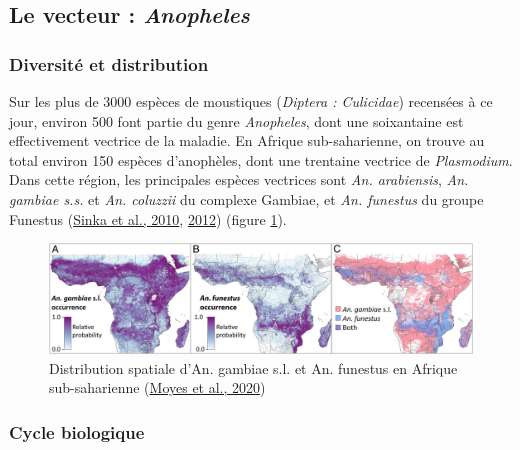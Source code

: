 \documentclass[12pt,twoside]{reedthesis}
\begin{document}
\hypertarget{le-vecteur-anopheles}{%
\subsection{\texorpdfstring{Le vecteur : \emph{Anopheles}}{Le vecteur : Anopheles}}\label{le-vecteur-anopheles}}

\hypertarget{diversituxe9-et-distribution-1}{%
\subsubsection{Diversité et distribution}\label{diversituxe9-et-distribution-1}}

Sur les plus de 3000 espèces de moustiques (\emph{Diptera : Culicidae}) recensées à ce jour, environ 500 font partie du genre \emph{Anopheles}, dont une soixantaine est effectivement vectrice de la maladie. En Afrique sub-saharienne, on trouve au total environ 150 espèces d'anophèles, dont une trentaine vectrice de \emph{Plasmodium}. Dans cette région, les principales espèces vectrices sont \emph{An. arabiensis}, \emph{An. gambiae s.s.} et \emph{An. coluzzii} du complexe Gambiae, et \emph{An. funestus} du groupe Funestus (\protect\hyperlink{ref-sinka_dominant_2010}{Sinka et al., 2010}, \protect\hyperlink{ref-sinka_global_2012}{2012}) (figure \ref{fig:distrib-vectors}).\\
\begin{figure}

{\centering \includegraphics[width=1\linewidth]{figure/distrib_vectors} 

}

\caption[Distribution spatiale d'An. gambiae s.l. et An. funestus en Afrique sub-saharienne]{Distribution spatiale d'An. gambiae s.l. et An. funestus en Afrique sub-saharienne (\protect\hyperlink{ref-moyes_evaluating_2020}{Moyes et al., 2020})}\label{fig:distrib-vectors}
\end{figure}
\hypertarget{cycle-biologique-1}{%
\subsubsection{Cycle biologique}\label{cycle-biologique-1}}
\end{document}
